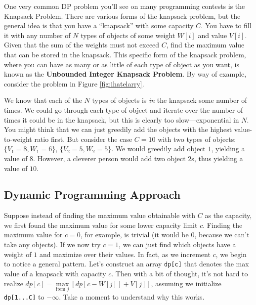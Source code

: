 One very common DP problem you'll see on many programming contests is the Knapsack Problem.  There are various forms of the knapsack problem, but the general idea is that you have a ``knapsack'' with some capacity $C$.  You have to fill it with any number of $N$ types of objects of some weight $W[i]$ and value $V[i]$.  Given that the sum of the weights must not exceed $C$, find the maximum value that can be stored in the knapsack.  This specific form of the knapsack problem, where you can have as many or as little of each type of object as you want, is known as the \textbf{Unbounded Integer Knapsack Problem}.
%
By way of example, consider the problem in Figure \ref{fig:ihatelarry}.
%


We know that each of the $N$ types of objects is \textit{in} the knapsack some number of times.  We could go through each type of object and iterate over the number of times it could be in the knapsack, but this is clearly too slow---exponential in $N$.
%
You might think that we can just greedily add the objects with the highest value-to-weight ratio first.  But consider the case $C = 10$ with two types of objects: $\{V_1 = 8, W_1 = 6\}$, $\{V_2 = 5, W_2 = 5\}$.  We would greedily add object $1$, yielding a value of $8$.  However, a cleverer person would add two object $2$s, thus yielding a value of $10$.
%
\subsection{Dynamic Programming Approach}
Suppose instead of finding the maximum value obtainable with $C$ as the capacity, we first found the maximum value for some lower capacity limit $c$.  Finding the maximum value for $c=0$, for example, is trivial (it would be 0, because we can't take any objects).  If we now try $c=1$, we can just find which objects have a weight of $1$ and maximize over their values.  In fact, as we increment $c$, we begin to notice a general pattern.  Let's construct an array \verb=dp[c]= that denotes the max value of a knapsack with capacity $c$.  Then with a bit of thought, it's not hard to realize $dp[c] = \max\limits_{\text{item } j} \left[dp[c-W[j]]+V[j]\right]$, assuming we initialize \verb=dp[1...C]= to $-\infty$.  Take a moment to understand why this works.

